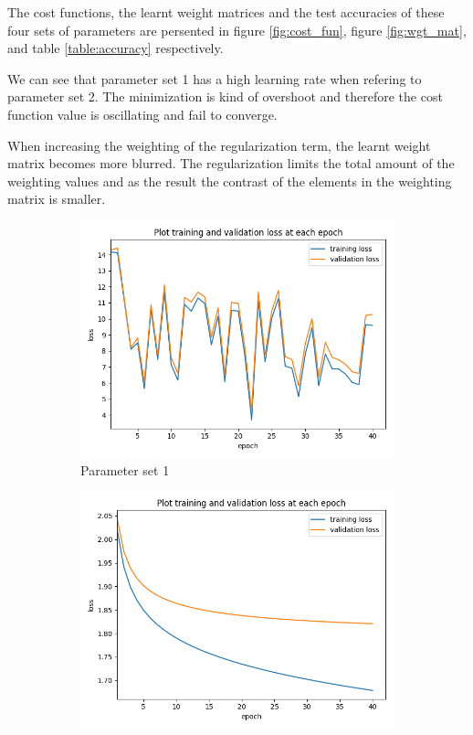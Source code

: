 \documentclass[12pt]{article}
\begin{document}
The cost functions, the learnt weight matrices and the test accuracies of these four
sets of parameters are persented in figure \ref{fig:cost_fun}, figure \ref{fig:wgt_mat},
and table \ref{table:accuracy} respectively.

We can see that parameter set 1 has a high learning rate when refering to parameter set 2.
The minimization is kind of overshoot and therefore the cost function
value is oscillating and fail to converge.

When increasing the weighting of the regularization term, the learnt weight matrix
becomes more blurred. The regularization limits the total amount of the weighting
values and as the result the contrast of the elements in the weighting matrix is smaller.

\begin{figure}
    \centering
    \begin{subfigure}[b]{0.475\textwidth}
        \centering
        \includegraphics[width=\textwidth]{loss_case1.png}
        \caption[]%
        {{\small Parameter set 1}}
    \end{subfigure}
    \hfill
    \begin{subfigure}[b]{0.475\textwidth}
        \centering
        \includegraphics[width=\textwidth]{loss_case2.png}

\end{subfigure}
\end{figure}
\end{document}

